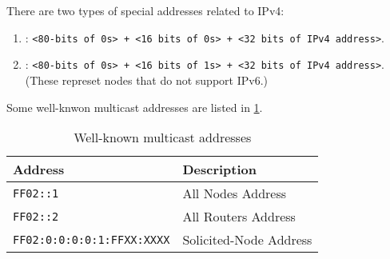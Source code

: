 There are two types of special addresses related to IPv4:
\begin{enumerate}
\item {} : \texttt{<80-bits of 0s> + <16
    bits of 0s> + <32 bits of IPv4 address>}.
\item {} : \texttt{<80-bits of 0s> + <16 bits of
    1s> + <32 bits of IPv4 address>}. (These represet nodes that do not support IPv6.)
\end{enumerate}



Some well-knwon multicast addresses are listed in \cref{tab:multicast}.

\begin{table}[h]
  \centering
  \begin{tabularx}{1.0\linewidth}{XX}
    Address & Description \\
    \hline
    \texttt{FF02::1} & All Nodes Address  \\
    \texttt{FF02::2} & All Routers Address  \\
    \texttt{FF02:0:0:0:0:1:FFXX:XXXX} & Solicited-Node Address \\
  \end{tabularx}
  \caption{Well-known multicast addresses}
  \label{tab:multicast}
\end{table}


